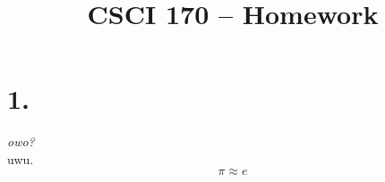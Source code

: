 \documentclass[12pt]{article}
\title{\vspace{-2\baselineskip}CSCI 170 -- Homework \HOMEWORKNUM}
\author{\NAME}
\date{\DATE}
\begin{document}
\maketitle

\section*{1.}
\textit{owo?} \\[\baselineskip]
uwu.
\begin{equation*} \pi \approx \boxed{e} \end{equation*}
\end{document}
